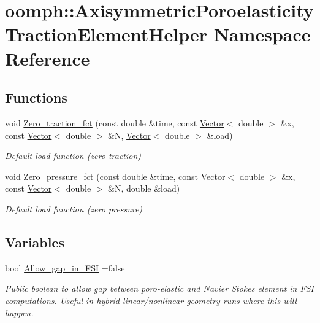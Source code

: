 \hypertarget{namespaceoomph_1_1AxisymmetricPoroelasticityTractionElementHelper}{}\section{oomph\+:\+:Axisymmetric\+Poroelasticity\+Traction\+Element\+Helper Namespace Reference}
\label{namespaceoomph_1_1AxisymmetricPoroelasticityTractionElementHelper}
\subsection*{Functions}
\begin{DoxyCompactItemize}
\item 
void \hyperlink{namespaceoomph_1_1AxisymmetricPoroelasticityTractionElementHelper_ac1b72b45f96c640e7ddc520ca5c2b251}{Zero\+\_\+traction\+\_\+fct} (const double \&time, const \hyperlink{classoomph_1_1Vector}{Vector}$<$ double $>$ \&x, const \hyperlink{classoomph_1_1Vector}{Vector}$<$ double $>$ \&N, \hyperlink{classoomph_1_1Vector}{Vector}$<$ double $>$ \&load)
\begin{DoxyCompactList}\small\item\em Default load function (zero traction) \end{DoxyCompactList}\item 
void \hyperlink{namespaceoomph_1_1AxisymmetricPoroelasticityTractionElementHelper_a8f4239ad8976b18eb097acb4b6446a6d}{Zero\+\_\+pressure\+\_\+fct} (const double \&time, const \hyperlink{classoomph_1_1Vector}{Vector}$<$ double $>$ \&x, const \hyperlink{classoomph_1_1Vector}{Vector}$<$ double $>$ \&N, double \&load)
\begin{DoxyCompactList}\small\item\em Default load function (zero pressure) \end{DoxyCompactList}\end{DoxyCompactItemize}
\subsection*{Variables}
\begin{DoxyCompactItemize}
\item 
bool \hyperlink{namespaceoomph_1_1AxisymmetricPoroelasticityTractionElementHelper_a3f8d9dbd05b5f4e7cc89157083db2ef0}{Allow\+\_\+gap\+\_\+in\+\_\+\+F\+SI} =false
\begin{DoxyCompactList}\small\item\em Public boolean to allow gap between poro-\/elastic and Navier Stokes element in F\+SI computations. Useful in hybrid linear/nonlinear geometry runs where this will happen. \end{DoxyCompactList}\end{DoxyCompactItemize}


